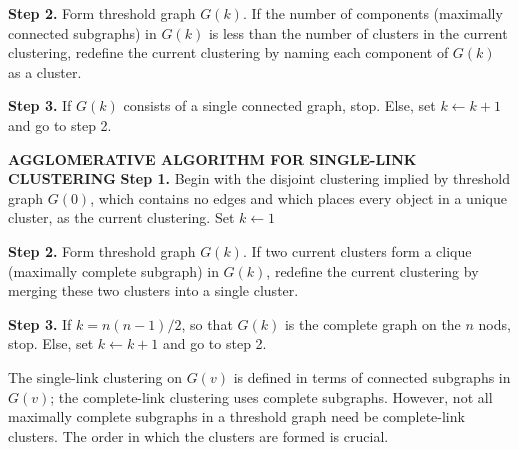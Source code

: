 \textbf{Step 2.} Form threshold graph $G(k)$. If the number of components (maximally connected subgraphs) in $G(k)$ is less than the number of clusters in the current clustering, redefine the current clustering by naming each component of $G(k)$ as a cluster.

\textbf{Step 3.} If $G(k)$ consists of a single connected graph, stop. Else, set $k \leftarrow k + 1$ and go to step 2.

\textbf{AGGLOMERATIVE ALGORITHM FOR SINGLE-LINK CLUSTERING}
\textbf{Step 1.} Begin with the disjoint clustering implied by threshold graph $G(0)$, which contains no edges and which places every object in a unique cluster, as the current clustering. Set $k \leftarrow 1$

\textbf{Step 2.} Form threshold graph $G(k)$. If two current clusters form a clique (maximally complete subgraph) in $G(k)$, redefine the current clustering by merging these two clusters into a single cluster.

\textbf{Step 3.} If $k = n(n-1)/2$, so that $G(k)$ is the complete graph on the $n$ nods, stop. Else, set $k \leftarrow k + 1$ and go to step 2.

The single-link clustering on $G(v)$ is defined in terms of connected subgraphs in $G(v)$; the complete-link clustering uses complete subgraphs. However, not all maximally complete subgraphs in a threshold graph need be complete-link clusters. The order in which the clusters are formed is crucial.
